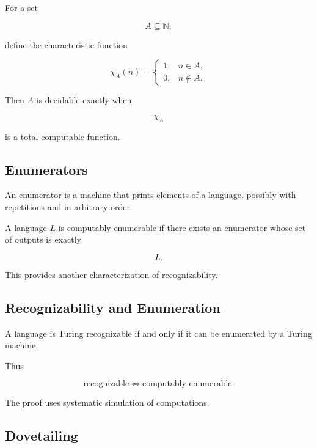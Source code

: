 For a set

\[
A\subseteq\mathbb{N},
\]

define the characteristic function

\[
\boxed{
\chi_A(n)
=
\begin{cases}
1,& n\in A,\\
0,& n\notin A.
\end{cases}
}
\]

Then \(A\) is decidable exactly when

\[
\boxed{
\chi_A
}
\]

is a total computable function.

\subsection{Enumerators}
\label{subsec:computability-enumerators}

An enumerator is a machine that prints elements of a language, possibly
with repetitions and in arbitrary order.

A language \(L\) is computably enumerable if there exists an enumerator
whose set of outputs is exactly

\[
\boxed{
L.
}
\]

This provides another characterization of recognizability.

\subsection{Recognizability and Enumeration}
\label{subsec:recognizability-enumeration}

A language is Turing recognizable if and only if it can be enumerated by a
Turing machine.

Thus

\[
\boxed{
\text{recognizable}
\iff
\text{computably enumerable}.
}
\]

The proof uses systematic simulation of computations.

\subsection{Dovetailing}
\label{subsec:dovetailing}

